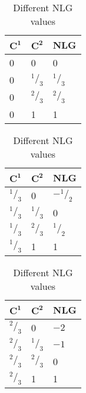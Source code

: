 \begin{table}
	\begin{subtable}{0.25\linewidth}
	\centering
	\begin{tabular}{lll}\hline
		$\mathbf{C^1}$ & $\mathbf{C^2}$ & \textbf{NLG} \\\hline
		0		& 0			& 0 \\
		0		& $^1/_3$	& $^1/_3$\\
		0		& $^2/_3$	& $^2/_3$\\
		0		& 1			& 1\\
	\end{tabular}
	\end{subtable}
	\hspace{0.1\linewidth}
	\begin{subtable}{0.25\linewidth}
	\centering
	\begin{tabular}{lll}\hline
		$\mathbf{C^1}$ & $\mathbf{C^2}$ & \textbf{NLG} \\\hline
		$^1/_3$	& 0			& $-^1/_2$\\
		$^1/_3$	& $^1/_3$	& 0\\
		$^1/_3$	& $^2/_3$	& $^1/_2$\\
		$^1/_3$	& 1			& 1\\
	\end{tabular}
	\end{subtable}
	\hspace{0.1\linewidth}
	\begin{subtable}{0.25\linewidth}
	\centering
	\begin{tabular}{lll}\hline
		$\mathbf{C^1}$ & $\mathbf{C^2}$ & \textbf{NLG} \\\hline
		$^2/_3$	& 0			& $-2$\\
		$^2/_3$	& $^1/_3$	& $-1$\\
		$^2/_3$	& $^2/_3$	& 0\\
		$^2/_3$	& 1			& 1\\
	\end{tabular}
	\end{subtable}
	\caption{Different NLG values}
	\label{tab:nlg_values}
\end{table}
